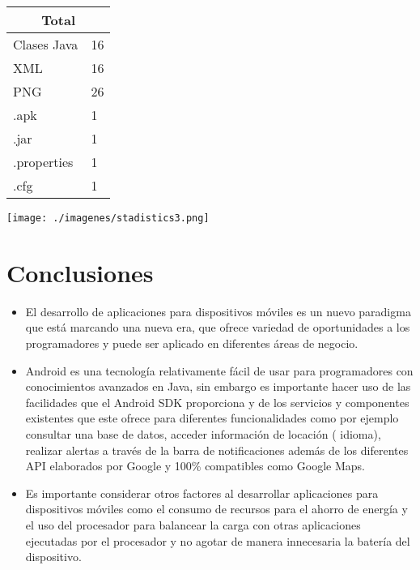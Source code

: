 \documentclass[letterpaper,12pt]{book}
\begin{document}
\begin{mainmatter}
 \begin{tabular}{|l|l|}
    \hline
    \multicolumn{2}{|c|}{Total} \\ 
    \hline  
    Clases Java & 16\\ \hline
    XML & 16\\ \hline
    PNG & 26\\ \hline
    .apk & 1\\ \hline
    .jar & 1\\ \hline
    .properties & 1\\ \hline
    .cfg & 1\\ \hline
\end{tabular}                

\begin{center}
 \texttt{[image: ./imagenes/stadistics3.png]}

\end{center}



\chapter{Conclusiones}
\begin{itemize}




\item  El desarrollo  de aplicaciones para  dispositivos móviles es  un nuevo
paradigma  que está  marcando una  nueva era,  que ofrece  variedad de
oportunidades a  los programadores y puede ser  aplicado en diferentes
áreas de negocio.

\item Android   es  una   tecnología  relativamente   fácil  de   usar  para
programadores  con conocimientos  avanzados  en Java,  sin embargo  es
importante hacer uso de las facilidades que el Android SDK proporciona
y  de los  servicios y  componentes  existentes que  este ofrece  para
diferentes  funcionalidades como  por  ejemplo consultar  una base  de
datos, acceder  información de locación ( idioma),  realizar alertas a
través  de la  barra de  notificaciones además  de los  diferentes API
elaborados por Google y 100\% compatibles como Google Maps.

\item Es  importante considerar otros  factores al  desarrollar aplicaciones
para dispositivos móviles  como el consumo de recursos  para el ahorro
de energía y  el uso del procesador para balancear  la carga con otras
aplicaciones  ejecutadas  por el  procesador  y  no  agotar de  manera
innecesaria la batería del dispositivo.


\end{itemize}
\end{mainmatter}
\end{document}
